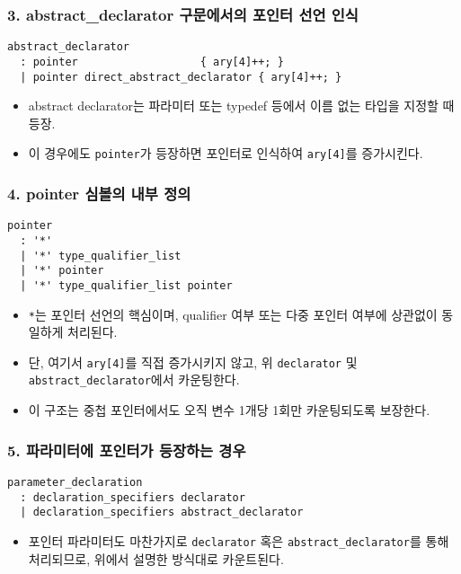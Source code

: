 \documentclass{article}
\begin{document}
\subsubsection*{3. abstract\_declarator 구문에서의 포인터 선언 인식}
\begin{lstlisting}
abstract_declarator
  : pointer                   { ary[4]++; }
  | pointer direct_abstract_declarator { ary[4]++; }
\end{lstlisting}

\begin{itemize}
  \item abstract declarator는 파라미터 또는 typedef 등에서 이름 없는 타입을 지정할 때 등장.
  \item 이 경우에도 \texttt{pointer}가 등장하면 포인터로 인식하여 \texttt{ary[4]}를 증가시킨다.
\end{itemize}

\subsubsection*{4. pointer 심볼의 내부 정의}
\begin{lstlisting}
pointer
  : '*'
  | '*' type_qualifier_list
  | '*' pointer
  | '*' type_qualifier_list pointer
\end{lstlisting}

\begin{itemize}
  \item \texttt{*}는 포인터 선언의 핵심이며, qualifier 여부 또는 다중 포인터 여부에 상관없이 동일하게 처리된다.
  \item 단, 여기서 \texttt{ary[4]}를 직접 증가시키지 않고, 위 \texttt{declarator} 및 \texttt{abstract\_declarator}에서 카운팅한다.
  \item 이 구조는 중첩 포인터에서도 오직 변수 1개당 1회만 카운팅되도록 보장한다.
\end{itemize}

\subsubsection*{5. 파라미터에 포인터가 등장하는 경우}

\begin{lstlisting}
parameter_declaration
  : declaration_specifiers declarator
  | declaration_specifiers abstract_declarator
\end{lstlisting}

\begin{itemize}
  \item 포인터 파라미터도 마찬가지로 \texttt{declarator} 혹은 \texttt{abstract\_declarator}를 통해 처리되므로, 위에서 설명한 방식대로 카운트된다.
\end{itemize}
\end{document}
